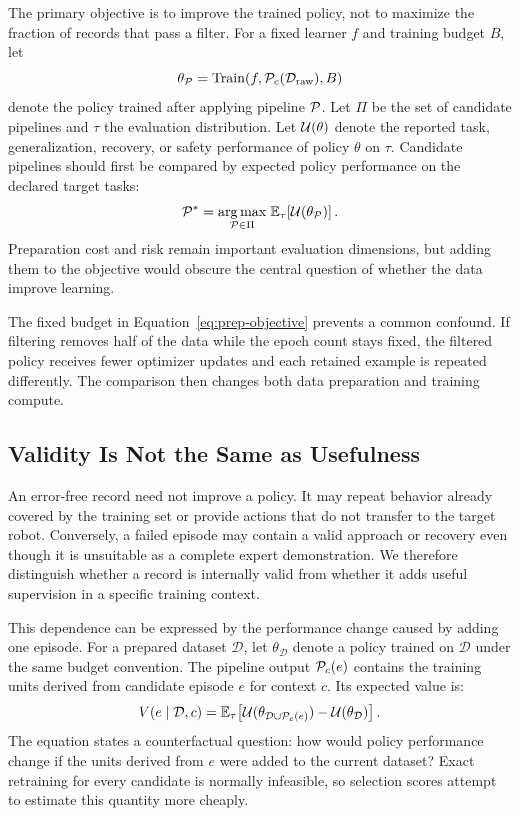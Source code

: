

The primary objective is to improve the trained policy, not to maximize the fraction of records that pass a filter.
For a fixed learner $f$ and training budget $B$, let
\begin{equation}
\theta_{\mathcal{P}}=\operatorname{Train}\!\left(f,\mathcal{P}_c(\mathcal{D}_{\mathrm{raw}}),B\right)
\end{equation}
denote the policy trained after applying pipeline $\mathcal{P}$.
Let $\Pi$ be the set of candidate pipelines and $\tau$ the evaluation distribution.
Let $\mathcal{U}(\theta)$ denote the reported task, generalization, recovery, or safety performance of policy $\theta$ on $\tau$.
Candidate pipelines should first be compared by expected policy performance on the declared target tasks:
\begin{equation}
\mathcal{P}^{*}=\underset{\mathcal{P}\in\Pi}{\arg\max}\;
\mathbb{E}_{\tau}\!\left[\mathcal{U}(\theta_{\mathcal{P}})\right].
\label{eq:prep-objective}
\end{equation}
Preparation cost and risk remain important evaluation dimensions, but adding them to the objective would obscure the central question of whether the data improve learning.

The fixed budget in Equation~\ref{eq:prep-objective} prevents a common confound.
If filtering removes half of the data while the epoch count stays fixed, the filtered policy receives fewer optimizer updates and each retained example is repeated differently.
The comparison then changes both data preparation and training compute.

\subsection{Validity Is Not the Same as Usefulness}

An error-free record need not improve a policy.
It may repeat behavior already covered by the training set or provide actions that do not transfer to the target robot.
Conversely, a failed episode may contain a valid approach or recovery even though it is unsuitable as a complete expert demonstration.
We therefore distinguish whether a record is internally valid from whether it adds useful supervision in a specific training context.

This dependence can be expressed by the performance change caused by adding one episode.
For a prepared dataset $\mathcal{D}$, let $\theta_{\mathcal{D}}$ denote a policy trained on $\mathcal{D}$ under the same budget convention.
The pipeline output $\mathcal{P}_c(e)$ contains the training units derived from candidate episode $e$ for context $c$.
Its expected value is:
\begin{equation}
V(e\mid \mathcal{D},c)=
\mathbb{E}_{\tau}\!\left[
\mathcal{U}(\theta_{\mathcal{D}\cup\mathcal{P}_c(e)})-
\mathcal{U}(\theta_{\mathcal{D}})
\right].
\label{eq:conditional-value}
\end{equation}
The equation states a counterfactual question: how would policy performance change if the units derived from $e$ were added to the current dataset?
Exact retraining for every candidate is normally infeasible, so selection scores attempt to estimate this quantity more cheaply.

